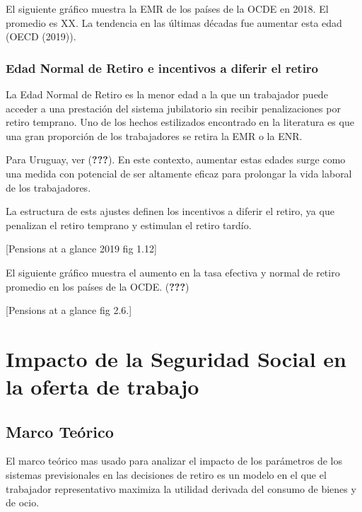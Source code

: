 \documentclass[]{article}
\begin{document}
El siguiente gráfico muestra la EMR de los países de la OCDE en 2018. El
promedio es XX. La tendencia en las últimas décadas fue aumentar esta
edad (OECD (2019)).

\hypertarget{edad-normal-de-retiro-e-incentivos-a-diferir-el-retiro}{%
\subsubsection{Edad Normal de Retiro e incentivos a diferir el
retiro}\label{edad-normal-de-retiro-e-incentivos-a-diferir-el-retiro}}

La Edad Normal de Retiro es la menor edad a la que un trabajador puede
acceder a una prestación del sistema jubilatorio sin recibir
penalizaciones por retiro temprano. Uno de los hechos estilizados
encontrado en la literatura es que una gran proporción de los
trabajadores se retira la EMR o la ENR.

Para Uruguay, ver ({\textbf{???}}). En este contexto, aumentar estas
edades surge como una medida con potencial de ser altamente eficaz para
prolongar la vida laboral de los trabajadores.

La estructura de ests ajustes definen los incentivos a diferir el
retiro, ya que penalizan el retiro temprano y estimulan el retiro
tardío.

{[}Pensions at a glance 2019 fig 1.12{]}

El siguiente gráfico muestra el aumento en la tasa efectiva y normal de
retiro promedio en los países de la OCDE. ({\textbf{???}})

{[}Pensions at a glance fig 2.6.{]}

\hypertarget{impacto-de-la-seguridad-social-en-la-oferta-de-trabajo}{%
\section{Impacto de la Seguridad Social en la oferta de
trabajo}\label{impacto-de-la-seguridad-social-en-la-oferta-de-trabajo}}

\hypertarget{marco-teuxf3rico}{%
\subsection{Marco Teórico}\label{marco-teuxf3rico}}

El marco teórico mas usado para analizar el impacto de los parámetros de
los sistemas previsionales en las decisiones de retiro es un modelo en
el que el trabajador representativo maximiza la utilidad derivada del
consumo de bienes y de ocio.
\end{document}
